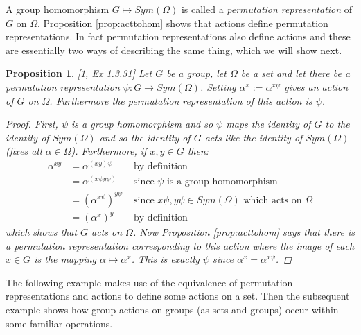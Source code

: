 \documentclass[]{article}
\newtheorem{prop}[thm]{Proposition}
\theoremstyle{definition}
\begin{document}
A group homomorphism $G \mapsto Sym(\Omega)$ is called a \emph{permutation representation} of $G$ on $\Omega$. Proposition \ref{prop:acttohom} shows that actions define permutation representations. In fact permutation representations also define actions and these are essentially two ways of describing the same thing, which we will show next.

\begin{prop} \emph{[1, Ex 1.3.31]}
Let $G$ be a group, let $\Omega$ be a set and let there be a permutation representation $\psi:G \rightarrow Sym(\Omega)$. Setting $\alpha^x := \alpha^{x\psi}$ gives an action of $G$ on $\Omega$. Furthermore the permutation representation of this action is $\psi$.
\begin{proof}
First, $\psi$ is a group homomorphism and so $\psi$ maps the identity of $G$ to the identity of $Sym(\Omega)$ and so the identity of $G$ acts like the identity of $Sym(\Omega)$ (fixes all $\alpha \in \Omega$). Furthermore, if $x,y \in G$ then:
\begin{align*}
\alpha^{xy} & = \alpha^{(xy)\psi} & \mbox{ by definition} \\
& = \alpha^{(x\psi y\psi)} & \mbox{ since } \psi \mbox{ is a group homomorphism} \\
& = (\alpha^{x\psi})^{y\psi} & \mbox{ since } x\psi,y\psi \in Sym(\Omega) \mbox{ which acts on } \Omega \\
& = (\alpha^x)^y & \mbox{ by definition}
\end{align*}
which shows that $G$ acts on $\Omega$. Now Proposition \ref{prop:acttohom} says that there is a permutation representation corresponding to this action where the image of each $x \in G$ is the mapping $\alpha \mapsto \alpha^x$. This is exactly $\psi$ since $\alpha^x = \alpha^{x\psi}$.
\end{proof} 
\end{prop}

The following example makes use of the equivalence of permutation representations and actions to define some actions on a set. Then the subsequent example shows how group actions on groups (as sets and groups) occur within some familiar operations.
\end{document}

